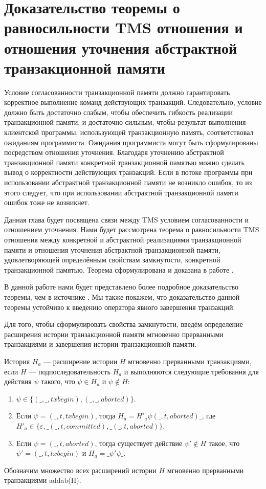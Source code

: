 \chapter{Доказательство теоремы о равносильности TMS отношения и отношения уточнения абстрактной транзакционной памяти}
Условие согласованности транзакционной памяти должно гарантировать корректное выполнение команд действующих транзакций. Следовательно, условие должно быть достаточно слабым, чтобы обеспечить гибкость реализации транзакционной памяти, и достаточно сильным, чтобы результат выполнения клиентской программы, использующей транзакционную память, соответствовал ожиданиям программиста. Ожидания программиста могут быть сформулированы посредством отношения уточнения. Благодаря уточнению абстрактной транзакционной памяти конкретной транзакционной памятью можно сделать вывод о корректности действующих транзакций. Если в потоке программы при использовании абстрактной транзакционной памяти не возникло ошибок, то из этого следует, что при использовании абстрактной транзакционной памяти ошибок тоже не возникнет. 

Данная глава будет посвящена связи между TMS условием согласованности и отношением уточнения. Нами будет рассмотрена теорема о равносильности TMS отношения между конкретной и абстрактной реализациями транзакционной памяти и отношения уточнения абстрактной транзакционной памяти, удовлетворяющей определённым свойствам замкнутости, конкретной транзакционной памятью. Теорема сформулирована и доказана в работе \cite{tms_article}.

В данной работе нами будет представлено более подробное доказательство теоремы, чем в источнике \cite{tms_article}. Мы также покажем, что доказательство данной теоремы \cite{tms_article} устойчиво к введению оператора явного завершения транзакций. 

Для того, чтобы сформулировать свойства замкнутости, введём определение расширения  истории транзакционной памяти мгновенно прерванными транзакциями и завершения истории транзакционной памяти.  
\begin{mydefinition} История $H_a$ --- расширение истории $H$ мгновенно прерванными транзакциями, если $H$ --- подпоследовательность $H_a$ и выполняются следующие требования для действия $\psi$ такого, что $\psi \in H_a$ и $\psi \notin H$:
\begin{enumerate}[label=(\roman*)]
\item $\psi \in \{(\_, \_, txbegin), (\_, \_, aborted)\}$.
\item Если $\psi = (\_, t, txbegin)$, тогда $H_a = H'_a\psi(\_, t, aborted)\_$, где $H'_a \in \{\varepsilon, \_(\_, t, committed), \_(\_, t, aborted)\}$.
\item Если $\psi = (\_, t, aborted)$, тогда существует действие $\psi' \notin H$ такое, что $\psi' = (\_, t, txbegin)$ и $H_a = \_\psi'\psi\_$. 
\end{enumerate}
Обозначим множество всех расширений истории $H$ мгновенно прерванными транзакциями addab(H).
\end{mydefinition}

